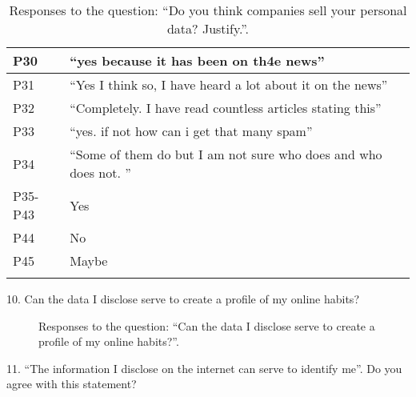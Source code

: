 \begin{longtable}{p{3cm} p{13cm}}
    \hline
    P30 & ``yes because it has been on th4e news'' \\
    \hline
    P31 & ``Yes I think so, I have heard a lot about it on the news'' \\
    \hline
    P32 & ``Completely. I have read countless articles stating this'' \\
    \hline
    P33 & ``yes. if not how can i get that many spam'' \\
    \hline
    P34 & ``Some of them do but I am not sure who does and who does not. '' \\
    \hline
    P35-P43 & Yes \\
    \hline
    P44 & No \\
    \hline
    P45 & Maybe \\
    \hline
    \caption{Responses to the question: ``Do you think companies sell your personal data? Justify.''.}
    \label{table:survey_s5_q9}
\end{longtable}

10. Can the data I disclose serve to create a profile of my online habits?

\begin{figure}[H]
    \begin{center}
        \caption{Responses to the question: ``Can the data I disclose serve to create a profile of my online habits?''.}
        \label{fig:survey_s5_q10}
    \end{center}
\end{figure}

11. ``The information I disclose on the internet can serve to identify me''. Do you agree with this statement?

